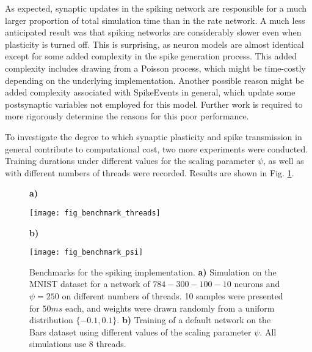 As expected, synaptic updates in the spiking network are responsible for a much larger proportion of total simulation
time than in the rate network. A much less anticipated result was that spiking networks are considerably slower even
when plasticity is turned off. This is surprising, as neuron models are almost identical except for some added
complexity in the spike generation process. This added complexity includes drawing from a Poisson process, which might
be time-costly depending on the underlying implementation. Another possible reason might be added complexity associated
with SpikeEvents in general, which update some postsynaptic variables not employed for this model. Further work is
required to more rigorously determine the reasons for this poor performance.\newline

\noindent To investigate the degree to which synaptic plasticity and spike transmission in general contribute to
computational cost, two more experiments were conducted. Training durations under different values for the scaling
parameter $\psi$, as well as with different numbers of threads were recorded. Results are shown in Fig.
\ref{fig-benchmark-threads-psi}.

\begin{figure}[h]
    \centering
    \begin{minipage}{0.5\textwidth}
        \textbf{a)}\par\medskip
        \centering
        \texttt{[image: fig\_benchmark\_threads]}
    \end{minipage}\hfill
    \begin{minipage}{0.5\textwidth}
        \textbf{b)}\par\medskip
        \centering
        \texttt{[image: fig\_benchmark\_psi]}
    \end{minipage}
    \caption[Benchmarks for the spiking implementation]{Benchmarks for the spiking implementation. \textbf{a)}
        Simulation on the MNIST dataset for a network of $784-300-100-10$ neurons and $\psi=250$ on different numbers of
        threads. 10 samples were presented for $50ms$ each, and weights were drawn randomly from a uniform distribution
        $ \{-0.1, 0.1\}$. \textbf{b)} Training of a default network on the Bars dataset using different values of the
        scaling parameter $\psi$. All simulations use 8 threads.}
    \label{fig-benchmark-threads-psi}
\end{figure}

